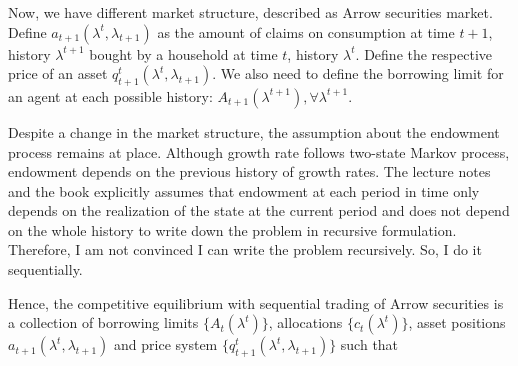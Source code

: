 \documentclass[]{article}
\begin{document}
\subsubsection{}
Now, we have different market structure, described as Arrow securities market. Define $a_{t+1}(\lambda^t, \lambda_{t+1})$ as the amount of claims on consumption at time $t + 1$, history $\lambda^{t+1}$ bought by a household at time $t$, history $\lambda^t$. Define the respective price of an asset $q_{t+1}^t(\lambda^t, \lambda_{t+1})$. We also need to define the borrowing limit for an agent at each possible history: $A_{t + 1}(\lambda^{t+1}), \forall \lambda^{t+1}$.

Despite a change in the market structure, the assumption about the endowment process remains at place. Although growth rate follows two-state Markov process, endowment depends on the previous history of growth rates. The lecture notes and the book explicitly assumes that endowment at each period in time only depends on the realization of the state at the current period and does not depend on the whole history to write down the problem in recursive formulation. Therefore, I am not convinced I can write the problem recursively. So, I do it sequentially.

Hence, the competitive equilibrium with sequential trading of Arrow securities is a collection of borrowing limits $\{A_t(\lambda^t)\}$, allocations $\{c_t(\lambda^t)\}$, asset positions $a_{t+1}(\lambda^t, \lambda_{t+1})$ and price system $\{q_{t+1}^t(\lambda^t, \lambda_{t+1})\}$ such that
\end{document}
